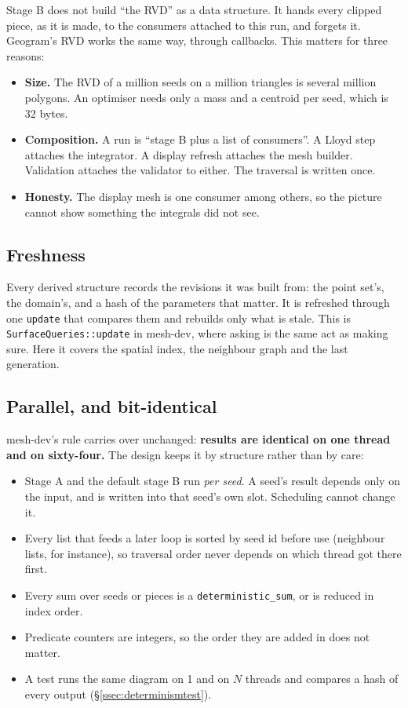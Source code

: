 \documentclass[11pt,a4paper]{article}
\newcommand{\code}[1]{\texttt{#1}}          %
\newcommand{\secref}[1]{\S\ref{#1}}
\begin{document}
Stage B does not build ``the RVD'' as a data structure. It hands every clipped piece, as it is
made, to the consumers attached to this run, and forgets it. Geogram's RVD works the same way,
through callbacks. This matters for three reasons:

\begin{itemize}
\item \textbf{Size.} The RVD of a million seeds on a million triangles is several million
  polygons. An optimiser needs only a mass and a centroid per seed, which is 32 bytes.
\item \textbf{Composition.} A run is ``stage B plus a list of consumers''. A Lloyd step attaches
  the integrator. A display refresh attaches the mesh builder. Validation attaches the validator
  to either. The traversal is written once.
\item \textbf{Honesty.} The display mesh is one consumer among others, so the picture cannot show
  something the integrals did not see.
\end{itemize}

\subsection{Freshness}\label{ssec:freshness}

Every derived structure records the revisions it was built from: the point set's, the domain's,
and a hash of the parameters that matter. It is refreshed through one \code{update} that
compares them and rebuilds only what is stale. This is \code{SurfaceQueries::update} in
mesh-dev, where asking is the same act as making sure. Here it covers the spatial index, the
neighbour graph and the last generation.

\subsection{Parallel, and bit-identical}\label{ssec:determinism}

mesh-dev's rule carries over unchanged: \textbf{results are identical on one thread and on
sixty-four.} The design keeps it by structure rather than by care:

\begin{itemize}
\item Stage A and the default stage B run \emph{per seed}. A seed's result depends only on the
  input, and is written into that seed's own slot. Scheduling cannot change it.
\item Every list that feeds a later loop is sorted by seed id before use (neighbour lists, for
  instance), so traversal order never depends on which thread got there first.
\item Every sum over seeds or pieces is a \code{deterministic\_sum}, or is reduced in index
  order.
\item Predicate counters are integers, so the order they are added in does not matter.
\item A test runs the same diagram on 1 and on $N$ threads and compares a hash of every output
  (\secref{ssec:determinismtest}).
\end{itemize}
\end{document}
